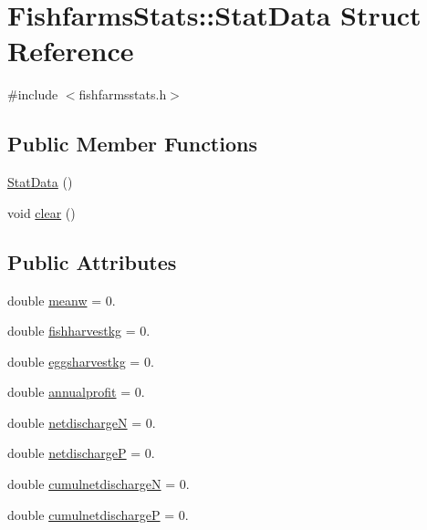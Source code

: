 \hypertarget{struct_fishfarms_stats_1_1_stat_data}{}\section{Fishfarms\+Stats\+::Stat\+Data Struct Reference}
\label{struct_fishfarms_stats_1_1_stat_data}


{\ttfamily \#include $<$fishfarmsstats.\+h$>$}

\subsection*{Public Member Functions}
\begin{DoxyCompactItemize}
\item 
\mbox{\hyperlink{struct_fishfarms_stats_1_1_stat_data_a931493139c56a610fd88ecf30a380bb5}{Stat\+Data}} ()
\item 
void \mbox{\hyperlink{struct_fishfarms_stats_1_1_stat_data_a4d91b03d28197ab5728e137c87ac84b3}{clear}} ()
\end{DoxyCompactItemize}
\subsection*{Public Attributes}
\begin{DoxyCompactItemize}
\item 
double \mbox{\hyperlink{struct_fishfarms_stats_1_1_stat_data_aa61e0c6587e1838544f72e40a8067619}{meanw}} = 0.
\item 
double \mbox{\hyperlink{struct_fishfarms_stats_1_1_stat_data_a81d4cec24265971e1c2219158c47bec6}{fishharvestkg}} = 0.
\item 
double \mbox{\hyperlink{struct_fishfarms_stats_1_1_stat_data_a3e34a383b712be2d936c45e7e364ea3b}{eggsharvestkg}} = 0.
\item 
double \mbox{\hyperlink{struct_fishfarms_stats_1_1_stat_data_a2eac91446d69e28b20fe7a03b29ad81b}{annualprofit}} = 0.
\item 
double \mbox{\hyperlink{struct_fishfarms_stats_1_1_stat_data_a820b384056d880c029c9fc4daf5ce26d}{netdischargeN}} = 0.
\item 
double \mbox{\hyperlink{struct_fishfarms_stats_1_1_stat_data_aff7b1304010247d67d623e5fe5716789}{netdischargeP}} = 0.
\item 
double \mbox{\hyperlink{struct_fishfarms_stats_1_1_stat_data_a2662c2e1a9c7a021e9b78f580ba3124b}{cumulnetdischargeN}} = 0.
\item 
double \mbox{\hyperlink{struct_fishfarms_stats_1_1_stat_data_acf8552627a22567bd52acab553a4929c}{cumulnetdischargeP}} = 0.
\end{DoxyCompactItemize}


